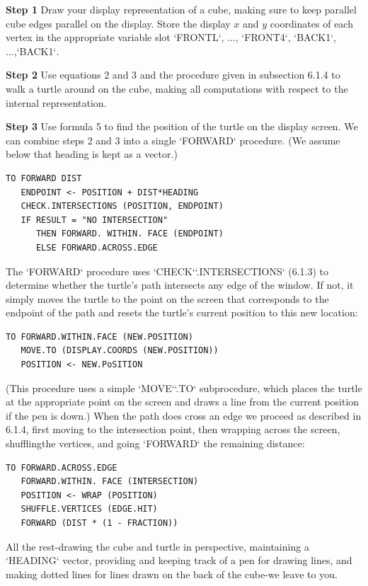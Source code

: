 \documentclass{book}
\begin{document}
\noindent \textbf{Step 1} Draw your display representation of a cube, making sure to keep
parallel cube edges parallel on the display. Store the display $x$ and $y$
coordinates of each vertex in the appropriate variable slot \textsc{`FRONTL`}, ...,
\textsc{`FRONT4`}, \textsc{`BACK1`}, ...,\textsc{`BACK1`}.

\noindent \textbf{Step 2} Use equations 2 and 3 and the procedure given in subsection
6.1.4 to walk a turtle around on the cube, making all computations with
respect to the internal representation.

\noindent \textbf{Step 3} Use formula 5 to find the position of the turtle on the display
screen.
We can combine steps 2 and 3 into a single \textsc{`FORWARD`} procedure. (We
assume below that heading is kept as a vector.)

\begin{verbatim}
TO FORWARD DIST
   ENDPOINT <- POSITION + DIST*HEADING
   CHECK.INTERSECTIONS (POSITION, ENDPOINT)
   IF RESULT = "NO INTERSECTION"
      THEN FORWARD. WITHIN. FACE (ENDPOINT)
      ELSE FORWARD.ACROSS.EDGE
\end{verbatim}
The \textsc{`FORWARD`} procedure uses \textsc{`CHECK`}\textsc{`.INTERSECTIONS`} (6.1.3) to determine whether the turtle's path intersects any edge of the window. If not,
it simply moves the turtle to the point on the screen that corresponds to
the endpoint of the path and resets the turtle's current position to this
new location:

\begin{verbatim}
TO FORWARD.WITHIN.FACE (NEW.POSITION)
   MOVE.TO (DISPLAY.COORDS (NEW.POSITION))
   POSITION <- NEW.PoSITION
\end{verbatim}
(This procedure uses a simple \textsc{`MOVE`}\textsc{`.TO`} subprocedure, which places the
turtle at the appropriate point on the screen and draws a line from the
current position if the pen is down.)
When the path does cross an edge we proceed as described in 6.1.4,
first moving to the intersection point, then wrapping across the screen,
shufflingthe vertices, and going \textsc{`FORWARD`} the remaining distance:

\begin{verbatim}
TO FORWARD.ACROSS.EDGE
   FORWARD.WITHIN. FACE (INTERSECTION)
   POSITION <- WRAP (POSITION)
   SHUFFLE.VERTICES (EDGE.HIT)
   FORWARD (DIST * (1 - FRACTION))
\end{verbatim}
All the rest-drawing the cube and turtle in perspective, maintaining
a \textsc{`HEADING`} vector, providing and keeping track of a pen for drawing lines,
and making dotted lines for lines drawn on the back of the cube-we
leave to you.
\end{document}
